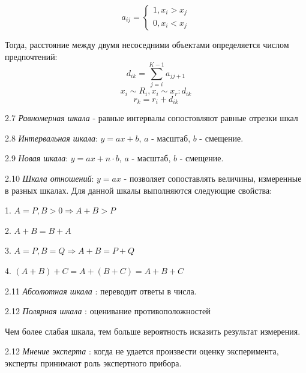 \documentclass[aps,%
12pt,%
final,%
oneside,
onecolumn,%
musixtex, %
superscriptaddress,%
centertags]{article} %
\begin{document}
$$a_{ij} = 
\left\{
\begin{matrix}
1, x_i > x_j \\
0, x_i < x_j
\end{matrix} \right.
$$

Тогда, расстояние между двумя несоседними объектами определяется числом предпочтений:
$$ d_{ik} = \sum_{j=i}^{K-1} a_{jj+1} $$
$$ x_i \sim R_i , x_i \sim x_r: d_{ik} $$
$$ r_k = r_i +d_{ik} $$

2.7 \textit{Равномерная шкала} - равные интервалы сопостовляют равные отрезки шкал

2.8 \textit{Интервальная шкала}: $y = ax+b$, $a$ - масштаб, $b$ - смещение.

2.9 \textit{Новая шкала}: $y = ax+n\cdot b$, $a$ - масштаб, $b$ - смещение.

2.10 \textit{Шкала отношений}: $y = ax$ - позволяет сопоставлять величины, измеренные в разных шкалах. Для данной шкалы выполняются следующие свойства:

\begin{center}
1. $ A=P,B>0 \Rightarrow A + B > P $

2. $ A + B = B + A $

3. $ A = P, B = Q \Rightarrow A + B = P + Q $

4. $(A + B ) + C = A + (B + C) = A + B + C$
\end{center}

2.11 \textit{Абсолютная шкала }: переводит ответы в числа.

2.12 \textit{Полярная шкала }: оценивание противоположностей

Чем более слабая шкала, тем больше вероятность исказить результат измерения.

2.12 \textit{Мнение эксперта }: когда не удается произвести оценку эксперимента, эксперты принимают роль экспертного прибора.
\end{document}
